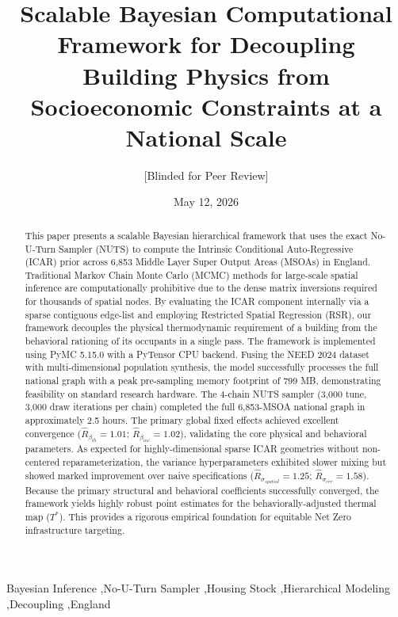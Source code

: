 \documentclass[11pt, a4paper, twocolumn, numbers]{elsarticle}
\begin{document}
\begin{frontmatter}

\title{Scalable Bayesian Computational Framework for Decoupling Building Physics from Socioeconomic Constraints at a National Scale}
\author{[Blinded for Peer Review]}
\date{May 12, 2026}

\begin{abstract}
This paper presents a scalable Bayesian hierarchical framework that uses the exact No-U-Turn Sampler (NUTS) to compute the Intrinsic Conditional Auto-Regressive (ICAR) prior across 6,853 Middle Layer Super Output Areas (MSOAs) in England. Traditional Markov Chain Monte Carlo (MCMC) methods for large-scale spatial inference are computationally prohibitive due to the dense matrix inversions required for thousands of spatial nodes. By evaluating the ICAR component internally via a sparse contiguous edge-list and employing Restricted Spatial Regression (RSR), our framework decouples the physical thermodynamic requirement of a building from the behavioral rationing of its occupants in a single pass. The framework is implemented using PyMC 5.15.0 with a PyTensor CPU backend. Fusing the NEED 2024 dataset with multi-dimensional population synthesis, the model successfully processes the full national graph with a peak pre-sampling memory footprint of 799 MB, demonstrating feasibility on standard research hardware. The 4-chain NUTS sampler (3,000 tune, 3,000 draw iterations per chain) completed the full 6,853-MSOA national graph in approximately 2.5 hours. The primary global fixed effects achieved excellent convergence ($\hat{R}_{\beta_{th}} = 1.01$; $\hat{R}_{\beta_{inc}} = 1.02$), validating the core physical and behavioral parameters. As expected for highly-dimensional sparse ICAR geometries without non-centered reparameterization, the variance hyperparameters exhibited slower mixing but showed marked improvement over naive specifications ($\hat{R}_{\sigma_{spatial}} = 1.25$; $\hat{R}_{\sigma_{err}} = 1.58$). Because the primary structural and behavioral coefficients successfully converged, the framework yields highly robust point estimates for the behaviorally-adjusted thermal map ($T^*$). This provides a rigorous empirical foundation for equitable Net Zero infrastructure targeting.
\end{abstract}

\begin{keyword}
Bayesian Inference \sep No-U-Turn Sampler \sep Housing Stock \sep Hierarchical Modeling \sep Decoupling \sep England
\end{keyword}


\end{frontmatter}
\end{document}
